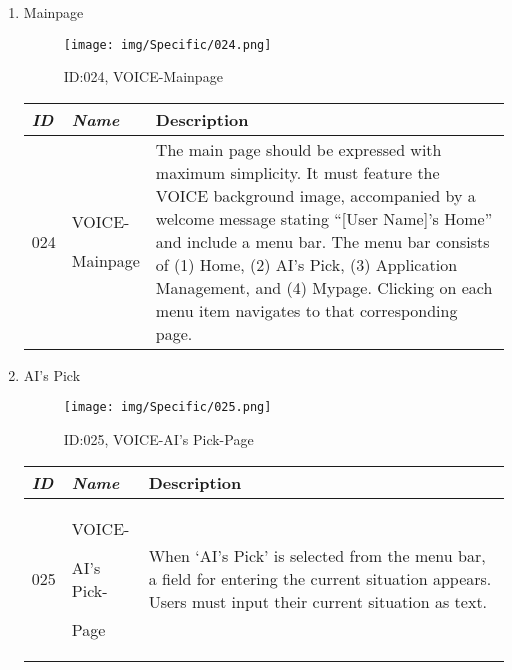 \documentclass[conference]{IEEEtran}
\begin{document}
\begin{enumerate}[label=\arabic*]
    \vspace{2em}
    
    \item Mainpage\par
    \vspace{0.3em}

    \begin{figure}[h]
        \centering
        \texttt{[image: img/Specific/024.png]}
        \caption{ID:024, VOICE-Mainpage}
    \end{figure}

    \begin{table}[h]
    \def\arraystretch{1.2} \small
        \begin{tabular}{|p{1cm}|p{1.8cm}|p{4.8cm}|}
        \hline
            \textit{\textbf{ID}} & \textit{\textbf{Name}} & {\textbf{Description}} \\
        \hline
            024 \par & VOICE-\par Mainpage & The main page should be expressed with maximum simplicity. It must feature the VOICE background image, accompanied by a welcome message stating “[User Name]’s Home” and include a menu bar. The menu bar consists of (1) Home, (2) AI’s Pick, (3) Application Management, and (4) Mypage. Clicking on each menu item navigates to that corresponding page. \\
        \hline
        \end{tabular}
    \end{table}

    \newpage

    \item AI's Pick\par
    \vspace{0.3em}

    \begin{figure}[h]
        \centering
        \texttt{[image: img/Specific/025.png]}
        \caption{ID:025, VOICE-AI's Pick-Page}
    \end{figure}

    \begin{table}[h]
    \def\arraystretch{1.2} \small
        \begin{tabular}{|p{1cm}|p{1.8cm}|p{4.8cm}|}
        \hline
            \textit{\textbf{ID}} & \textit{\textbf{Name}} & {\textbf{Description}} \\
        \hline
            025 \par & VOICE-\par AI's Pick-\par Page & When ‘AI's Pick’ is selected from the menu bar, a field for entering the current situation appears. Users must input their current situation as text. \\
        \hline
        \end{tabular}
    \end{table}


\end{enumerate}
\end{document}
